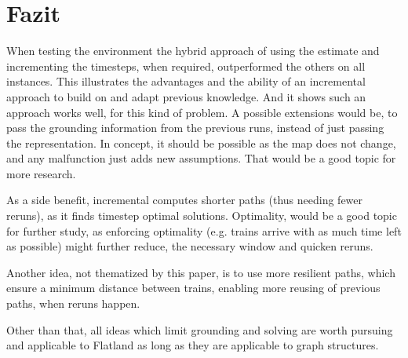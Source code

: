 \section{Fazit}
When testing the environment the hybrid approach of using the estimate and incrementing the timesteps, when required, outperformed the others on all instances. This illustrates the advantages and the ability of an incremental approach to build on and adapt previous knowledge. And it shows such an approach works well, for this kind of problem. A possible extensions would be, to pass the grounding information from the previous runs, instead of just passing the representation. In concept, it should be possible as the map does not change, and any malfunction just adds new assumptions. That would be a good topic for more research.

As a side benefit, incremental computes shorter paths (thus needing fewer reruns), as it finds timestep optimal solutions. Optimality, would be a good topic for further study, as enforcing optimality (e.g. trains arrive with as much time left as possible) might further reduce, the necessary window and quicken reruns.

Another idea, not thematized by this paper, is to use more resilient paths, which ensure a minimum distance between trains, enabling more reusing of previous paths, when reruns happen.  

Other than that, all ideas which limit grounding and solving are worth pursuing and applicable to Flatland as long as they are applicable to graph structures.

